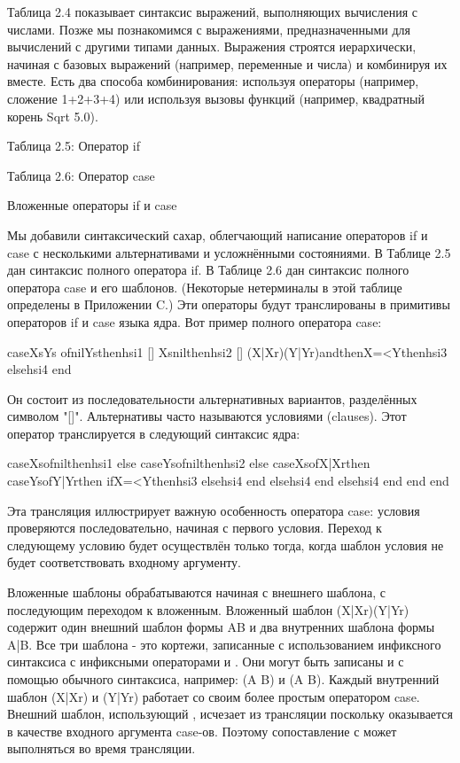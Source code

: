 Таблица 2.4 показывает синтаксис выражений, выполняющих вычисления с числами. Позже мы познакомимся с выражениями, предназначенными для вычислений с другими типами данных. Выражения строятся иерархически, начиная с базовых выражений (например, переменные и числа) и комбинируя их вместе. Есть два способа комбинирования: используя операторы (например, сложение 1+2+3+4) или используя вызовы функций (например, квадратный корень {Sqrt 5.0}).

Таблица 2.5: Оператор if

Таблица 2.6: Оператор case

Вложенные операторы if и case

Мы добавили синтаксический сахар, облегчающий написание операторов if и case с несколькими альтернативами и усложнёнными состояниями. В Таблице 2.5 дан синтаксис полного оператора if. В Таблице 2.6 дан синтаксис полного оператора case и его шаблонов. (Некоторые нетерминалы в этой таблице определены в Приложении C.) Эти операторы будут транслированы в примитивы операторов if и case языка ядра. Вот пример полного оператора case:

caseXsYs
ofnilYsthenhsi1
[] Xsnilthenhsi2
[] (X|Xr)(Y|Yr)andthenX=<Ythenhsi3
elsehsi4 end

Он состоит из последовательности альтернативных вариантов, разделённых символом "[]". Альтернативы часто называются условиями (clauses). Этот оператор транслируется в следующий синтаксис ядра:

caseXsofnilthenhsi1
else
caseYsofnilthenhsi2
else
caseXsofX|Xrthen
caseYsofY|Yrthen
ifX=<Ythenhsi3 elsehsi4 end
elsehsi4 end
elsehsi4 end
end
end

Эта трансляция иллюстрирует важную особенность оператора case: условия проверяются последовательно, начиная с первого условия. Переход к следующему условию будет осуществлён только тогда, когда шаблон условия не будет соответствовать входному аргументу.

Вложенные шаблоны обрабатываются начиная с внешнего шаблона, с последующим переходом к вложенным. Вложенный шаблон (X|Xr)(Y|Yr) содержит один внешний шаблон формы AB и два внутренних шаблона формы A|B. Все три шаблона - это кортежи, записанные с использованием инфиксного синтаксиса с инфиксными операторами  и . Они могут быть записаны и с помощью обычного синтаксиса, например: (A B) и (A B). Каждый внутренний шаблон  (X|Xr) и (Y|Yr) работает со своим более простым оператором case. Внешний шаблон, использующий , исчезает из трансляции поскольку оказывается в качестве входного аргумента case-ов. Поэтому сопоставление с  может выполняться во время трансляции.

